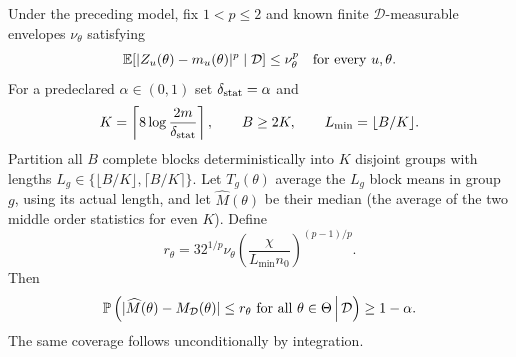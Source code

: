 \begin{theorem}
\label{thm:gate-a-clean}
Under the preceding model, fix $1<p\le2$ and known finite
$\mathcal D$-measurable envelopes $\nu_\theta$ satisfying
\begin{equation}
 \mathbb{E}[|Z_u(\theta)-m_u(\theta)|^p\mid\mathcal D]
 \le \nu_\theta^p
 \quad\text{for every }u,\theta.
\label{eq:gate-a-moment}
\end{equation}
For a predeclared $\alpha\in(0,1)$ set $\delta_{\rm stat}=\alpha$ and
\begin{equation}
 K=\left\lceil8\log\frac{2m}{\delta_{\rm stat}}\right\rceil,
 \qquad B\ge2K,\qquad L_{\min}=\lfloor B/K\rfloor.
\end{equation}
Partition all $B$ complete blocks deterministically into $K$ disjoint
groups with lengths $L_g\in\{\lfloor B/K\rfloor,\lceil B/K\rceil\}$.
Let $T_g(\theta)$ average the $L_g$ block means in group $g$, using its
actual length, and let $\widehat M(\theta)$ be their median (the average of
the two middle order statistics for even $K$). Define
\begin{equation}
 r_\theta=32^{1/p}\nu_\theta
       \left(\frac{\chi}{L_{\min}n_0}\right)^{(p-1)/p}.
\label{eq:gate-a-radius}
\end{equation}
Then
\begin{equation}
 \mathbb{P}\left(
  |\widehat M(\theta)-M_{\mathcal D}(\theta)|\le r_\theta
  \text{ for all }\theta\in\Theta
  \,\middle|\,\mathcal D\right)\ge1-\alpha.
\label{eq:gate-a-coverage}
\end{equation}
The same coverage follows unconditionally by integration.
\end{theorem}

